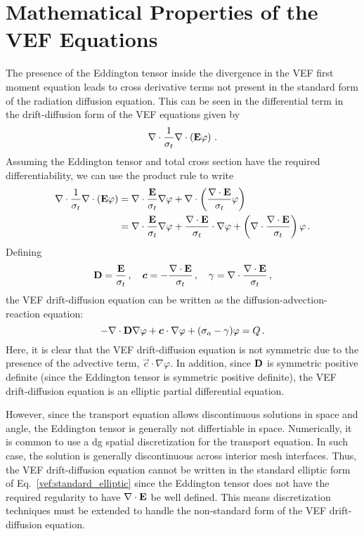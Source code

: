 \documentclass[../doc.tex]{subfiles}
\begin{document}
\section{Mathematical Properties of the VEF Equations}
The presence of the Eddington tensor inside the divergence in the VEF first moment equation leads to cross derivative terms not present in the standard form of the radiation diffusion equation. This can be seen in the differential term in the drift-diffusion form of the VEF equations given by
	\begin{equation}
		\nabla\cdot\frac{1}{\sigma_t}\nabla\cdot\left( \boldsymbol{\mathrm{E}}\varphi \right) \,. 
	\end{equation}
Assuming the Eddington tensor and total cross section have the required differentiability, we can use the product rule to write 
	\begin{equation}
	\begin{aligned}
		\nabla\cdot\frac{1}{\sigma_t}\nabla\cdot\left( \boldsymbol{\mathrm{E}}\varphi \right) &= \nabla\cdot\frac{\boldsymbol{\mathrm{E}}}{\sigma_t}\nabla\varphi + \nabla\cdot\left( \frac{\nabla\cdot\boldsymbol{\mathrm{E}}}{\sigma_t}\varphi \right) \\
		&= \nabla\cdot\frac{\boldsymbol{\mathrm{E}}}{\sigma_t}\nabla\varphi + \frac{\nabla\cdot\boldsymbol{\mathrm{E}}}{\sigma_t}\cdot\nabla\varphi + \left( \nabla\cdot\frac{\nabla\cdot\boldsymbol{\mathrm{E}}}{\sigma_t} \right) \varphi \,. 
	\end{aligned}
	\end{equation}
Defining 
	\begin{equation}
		\boldsymbol{\mathrm{D}} = \frac{\boldsymbol{\mathrm{E}}}{\sigma_t}\,,\quad \boldsymbol{c} = -\frac{\nabla\cdot\boldsymbol{\mathrm{E}}}{\sigma_t}\,, \quad \gamma = \nabla\cdot\frac{\nabla\cdot\boldsymbol{\mathrm{E}}}{\sigma_t} \,,
	\end{equation}
the VEF drift-diffusion equation can be written as the diffusion-advection-reaction equation: 
	\begin{equation} \label{vef:standard_elliptic}
		-\nabla\cdot\boldsymbol{\mathrm{D}}\nabla\varphi + \boldsymbol{c}\cdot\nabla\varphi + (\sigma_a - \gamma) \varphi = Q \,. 
	\end{equation}
Here, it is clear that the VEF drift-diffusion equation is not symmetric due to the presence of the advective term, $\vec{c}\cdot\nabla\varphi$. In addition, since $\boldsymbol{\mathrm{D}}$ is symmetric positive definite (since the Eddington tensor is symmetric positive definite), the VEF drift-diffusion equation is an elliptic partial differential equation. 

However, since the transport equation allows discontinuous solutions in space and angle, the Eddington tensor is generally not differtiable in space. Numerically, it is common to use a \gls{dg} spatial discretization for the transport equation. In such case, the solution is generally discontinuous across interior mesh interfaces. Thus, the VEF drift-diffusion equation cannot be written in the standard elliptic form of Eq.~\ref{vef:standard_elliptic} since the Eddington tensor does not have the required regularity to have $\nabla\cdot\boldsymbol{\mathrm{E}}$ be well defined. This means discretization techniques must be extended to handle the non-standard form of the VEF drift-diffusion equation. 
\end{document}
